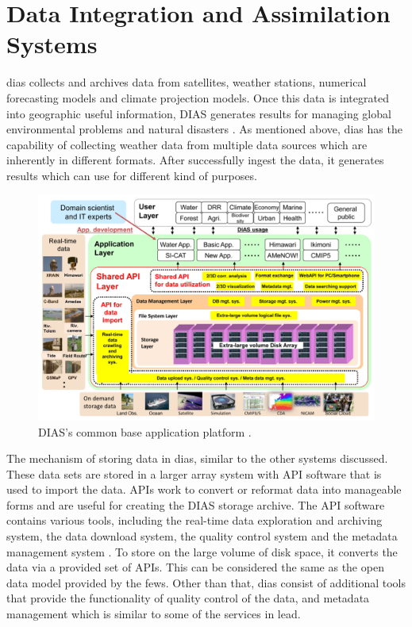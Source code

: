 \section{Data Integration and Assimilation Systems}
\label{se:dias}

\acrfull{dias} collects and archives data from satellites, weather stations, numerical forecasting models and climate projection models. Once this data is integrated into geographic useful information, DIAS generates results for managing global environmental problems and natural disasters \cite{Kawasaki2018DataReduction}. As mentioned above, \acrshort{dias} has the capability of collecting weather data from multiple data sources which are inherently in different formats. After successfully ingest the data, it generates results which can use for different kind of purposes.

\begin{figure}[htp]
    \centering
    \includegraphics[width=1\textwidth]{lit/other/dias_common_base_application_platform.jpg}
    \caption[DIAS’s common base application platform.]{DIAS’s common base application platform \cite{Kawasaki2018DataReduction}.}
    \label{fi:dias_common_platform}
\end{figure}

The mechanism of storing data in \acrshort{dias}, similar to the other systems discussed.
These data sets are stored in a larger array system with API software that is used to import the data. APIs work to convert or reformat data into manageable forms and are useful for creating the DIAS storage archive. The API software contains various tools, including the real-time data exploration and archiving system, the data download system, the quality control system and the metadata management system \cite{Kawasaki2018DataReduction}. To store on the large volume of disk space, it converts the data via a provided set of APIs. This can be considered the same as the open data model provided by the \acrshort{fews}. Other than that, \acrshort{dias} consist of additional tools that provide the functionality of quality control of the data, and metadata management which is similar to some of the services in \acrshort{lead}.

